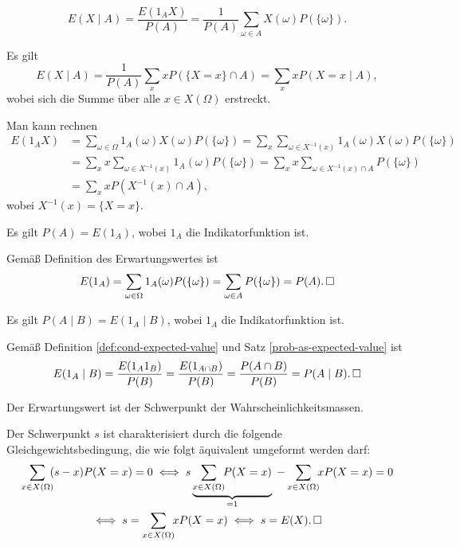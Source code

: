 \begin{Definition}%
%
\label{def:cond-expected-value}\newlinefirst
\[E(X\mid A) = \frac{E(1_A X)}{P(A)} = \frac{1}{P(A)}\sum_{\omega\in A} X(\omega)P(\{\omega\}).\]
\end{Definition}

\begin{Satz} Es gilt
\[E(X\mid A) = \frac{1}{P(A)}\sum_x xP(\{X=x\}\cap A)
= \sum_x xP(X=x\mid A),\]
wobei sich die Summe über alle $x\in X(\Omega)$ erstreckt.
\end{Satz}
 Man kann rechnen
\begin{align*}
E(1_A X) &= \sum_{\omega\in\Omega} 1_A(\omega) X(\omega) P(\{\omega\})
= \sum_x\sum_{\omega\in X^{-1}(x)} 1_A(\omega) X(\omega) P(\{\omega\})\\
&= \sum_x x\sum_{\omega\in X^{-1}(x)} 1_A(\omega) P(\{\omega\})
= \sum_x x\sum_{\omega\in X^{-1}(x)\cap A} P(\{\omega\})\\
&= \sum_x x P(X^{-1}(x)\cap A),
\end{align*}
wobei $X^{-1}(x) = \{X=x\}$.\;\qedsymbol

\begin{Satz}\label{prob-as-expected-value}
Es gilt $P(A) = E(1_A)$, wobei $1_A$ die Indikatorfunktion ist.
\end{Satz}
\begin{Beweis}
Gemäß Definition des Erwartungswertes ist
\[E(1_A) = \sum_{\omega\in\Omega} 1_A(\omega)P(\{\omega\})
= \sum_{\omega\in A}P(\{\omega\}) = P(A).\,\square\]
\end{Beweis}

\begin{Satz}
Es gilt $P(A\mid B) = E(1_A\mid B)$, wobei $1_A$ die Indikatorfunktion ist.
\end{Satz}
\begin{Beweis}
Gemäß Definition \ref{def:cond-expected-value}
und Satz \ref{prob-as-expected-value} ist
\[E(1_A\mid B) = \frac{E(1_A 1_B)}{P(B)} = \frac{E(1_{A\cap B})}{P(B)}
= \frac{P(A\cap B)}{P(B)} = P(A\mid B).\,\square\]
\end{Beweis}

\begin{Satz}
Der Erwartungswert ist der Schwerpunkt der Wahrscheinlichkeitsmassen.
\end{Satz}
\begin{Beweis} Der Schwerpunkt $s$ ist charakterisiert durch die folgende
Gleichgewichtsbedingung, die wie folgt äquivalent umgeformt werden
darf:
\begin{gather*}
\sum_{x\in X(\Omega)}\!\! (s-x)P(X=x) = 0
\iff s\underbrace{\sum_{x\in X(\Omega)}\!\! P(X=x)}_{=1}\;
- \sum_{x\in X(\Omega)}\!\! xP(X=x) = 0\\
\iff s = \sum_{x\in X(\Omega)}\!\! xP(X=x) \iff s = E(X).\,\qedsymbol
\end{gather*}
\end{Beweis}

